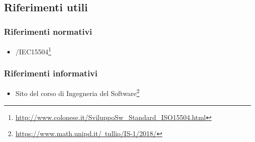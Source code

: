 \subsection{Riferimenti utili}
\subsubsection{Riferimenti normativi}
\begin{itemize}
    \item {}/IEC15504\footnote{\href{http://www.colonese.it/SviluppoSw_Standard_ISO15504.html}{http://www.colonese.it/SviluppoSw\_{}Standard\_{}ISO15504.html}}
\end{itemize}
\subsubsection{Riferimenti informativi}
\begin{itemize}
	\item Sito del corso di Ingegneria del Software\footnote{\href{https://www.math.unipd.it/~tullio/IS-1/2018/}{https://www.math.unipd.it/~tullio/IS-1/2018/}}
\end{itemize}
